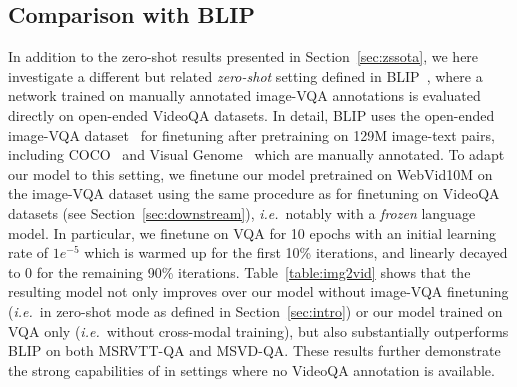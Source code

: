 \begin{table*}[!t]
\begin{center}
\caption{\small Zero-shot VideoQA results segmented per question type on the MSRVTT-QA dataset (left) and the MSVD-QA dataset (right), compared with Just Ask~\cite{yang2021just}.}
\label{table:qtype}
\end{center}
\end{table*}

\subsection{Comparison with BLIP}\label{sec:blip}
In addition to the zero-shot results presented in Section~\ref{sec:zssota}, we here investigate a different but related \textit{zero-shot} setting defined in BLIP~\cite{li2022blip}, where a network trained on manually annotated image-VQA annotations is evaluated directly on open-ended VideoQA datasets. 
In detail, BLIP uses the open-ended image-VQA dataset~\cite{antol2015vqa} for finetuning after pretraining on 129M image-text pairs, 
including COCO~\cite{chen2015microsoft} and Visual Genome~\cite{visualgenome} which are manually annotated.
To adapt our model to this setting, we finetune our model \model{} pretrained on WebVid10M on the image-VQA dataset using the same procedure as for finetuning on VideoQA datasets (see Section~\ref{sec:downstream}), \textit{i.e.}~notably with a \emph{frozen} language model.
In particular, we finetune on VQA for 10 epochs with an initial learning rate of $1e^{-5}$ which is warmed up for the first 10\% iterations, and linearly decayed to 0 for the remaining 90\% iterations.
Table~\ref{table:img2vid} shows that the resulting model not only improves over our model without image-VQA finetuning (\textit{i.e.}~in zero-shot mode as defined in Section~\ref{sec:intro}) or our model trained on VQA only (\textit{i.e.}~without cross-modal training), but also substantially outperforms BLIP on both MSRVTT-QA and MSVD-QA.
These results further demonstrate the strong capabilities of \model{} in settings where no VideoQA annotation is available.

